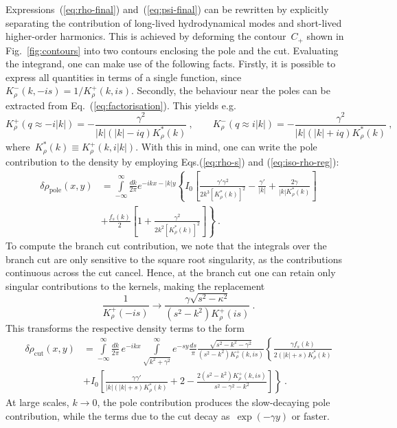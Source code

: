 \documentclass[preprint,aps,eqsecnum, prb]{revtex4-1}
\newcommand{\fplus}[1]{{#1}^{+}}
\newcommand{\fminus}[1]{{#1}^{-}}
\begin{document}
Expressions~(\ref{eq:rho-final}) and~(\ref{eq:psi-final}) can be
rewritten by explicitly separating the contribution of long-lived
hydrodynamical modes and short-lived higher-order harmonics. This
is achieved by deforming the contour~$C_{+}$ shown in Fig.~\ref{fig:contours}
into two contours enclosing the pole and the cut. Evaluating
the integrand, one can make use of the following facts.
Firstly,
it is possible to express all quantities in terms of a single function,
since~$\fminus{K}_\rho(k, -is) = 1/\fplus{K}_\rho(k, is)$.  Secondly,
the behaviour near the poles can be extracted from
Eq.~(\ref{eq:factorisation}). This yields e.g. \begin{equation}
 \fplus{K}_\rho (q \approx -i |k|)
 = - \frac{\gamma^2}{|k|(|k| - i q) K_\rho^\ast(k)}
 \ ,
 \qquad
 \fminus{K}_{\rho}(q \approx i |k|) = - \frac{\gamma^2}{|k|(|k| + iq)
   K_\rho^\ast(k)}
 \ ,
\end{equation}
where~$K_\rho^\ast(k) \equiv \fplus{K}_\rho(k, i|k|)$.
With this in mind, one can write the pole contribution
to the density by employing Eqs.(\ref{eq:rho-s}) and (\ref{eq:iso-rho-reg}):
\begin{align}
  \label{eq:rho-pole}
\delta \rho_\mathrm{pole}(x, y)
&= \int\limits_{-\infty}^{\infty}\frac{dk}{2\pi} e^{-ikx - |k| y}
\left\{I_0 \left[
\frac{\gamma'\gamma^2}{2k^3 \left[K_\rho^\ast(k)\right]^2}
- \frac{\gamma'}{|k|}
+ \frac{2\gamma}{|k| K_\rho^\ast(k)}\right] \right. \\\nonumber
  &+ \left.\frac{f_s(k)}{2} \left[1 + \frac{\gamma^2}{2 k^2
  \left[K_\rho^\ast(k)\right]^2} \right]
\right\} \ .
\end{align}
To compute the branch cut contribution,  we note that
the  integrals over the branch cut are only sensitive
to the square root singularity, as the contributions continuous
across the cut cancel.
Hence, at the branch cut one can retain only singular contributions
to the kernels, making the replacement
\begin{equation}
 \frac{1}{\fplus{K}_\rho (-is)} \to
  \frac{\gamma\sqrt{s^2 - \kappa^2}}{(s^2 - k^2) \fplus{K}_\rho(is)}
 \ .
\end{equation}
This transforms the respective density terms to the form
\begin{align}
\delta\rho_\mathrm{cut}(x, y) &= \int\limits_{-\infty}^{\infty}\frac{dk}{2\pi}
\, e^{-ikx}
\int\limits_{\sqrt{k^2 + \gamma^2}}^{\infty} e^{-sy}\frac{ds}{\pi}
\frac{\sqrt{s^2 - k^2 - \gamma^2}}{(s^2 - k^2) \fplus{K}_\rho(k, is)}
\left\{
\frac{\gamma f_s(k)}{2(|k| + s)K_\rho^\ast(k)}
\right. \\ \nonumber
     &+ \left. I_0 \left[\frac{\gamma\gamma'}{|k|(|k| + s) K_\rho^\ast(k)}
       + 2 - \frac{2(s^2 - k^2) \fplus{K}_\rho(k, is)}{s^2
                             - \gamma^2 - k^2} \right]
       \right\}  \ .
\end{align}
At large scales, $k\to 0$, the pole contribution produces
the slow-decaying pole contribution, while  the terms due
to the cut decay as~$\exp(-\gamma y)$ or faster.
\end{document}
